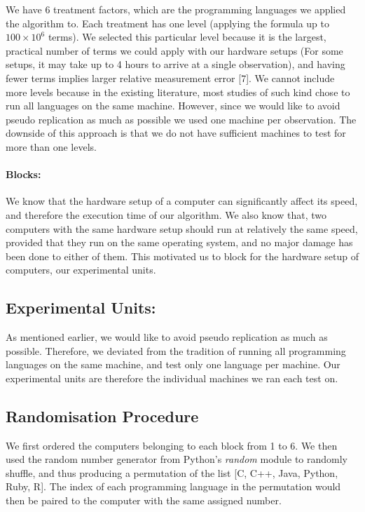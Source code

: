 \documentclass[12pt,halfline,a4paper,]{ouparticle}
\begin{document}
We have 6 treatment factors, which are the programming languages we
applied the algorithm to. Each treatment has one level (applying the
formula up to \(100 \times 10^6\) terms). We selected this particular
level because it is the largest, practical number of terms we could
apply with our hardware setups (For some setups, it may take up to 4
hours to arrive at a single observation), and having fewer terms implies
larger relative measurement error {[}7{]}. We cannot include more levels
because in the existing literature, most studies of such kind chose to
run all languages on the same machine. However, since we would like to
avoid pseudo replication as much as possible we used one machine per
observation. The downside of this approach is that we do not have
sufficient machines to test for more than one levels.

\paragraph{Blocks:}\label{blocks}

We know that the hardware setup of a computer can significantly affect
its speed, and therefore the execution time of our algorithm. We also
know that, two computers with the same hardware setup should run at
relatively the same speed, provided that they run on the same operating
system, and no major damage has been done to either of them. This
motivated us to block for the hardware setup of computers, our
experimental units.

\subsection{Experimental Units:}\label{experimental-units}

As mentioned earlier, we would like to avoid pseudo replication as much
as possible. Therefore, we deviated from the tradition of running all
programming languages on the same machine, and test only one language
per machine. Our experimental units are therefore the individual
machines we ran each test on.

\subsection{Randomisation Procedure}\label{randomisation-procedure}

We first ordered the computers belonging to each block from 1 to 6. We
then used the random number generator from Python's \emph{random} module
to randomly shuffle, and thus producing a permutation of the list {[}C,
C++, Java, Python, Ruby, R{]}. The index of each programming language in
the permutation would then be paired to the computer with the same
assigned number.
\end{document}
